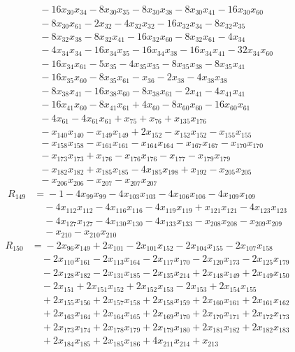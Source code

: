 \begin{align*}
&\quad{}-16x_{30}x_{34} -8x_{30}x_{35} -8x_{30}x_{38} -8x_{30}x_{41} -16x_{30}x_{60}\\
&\quad{}-8x_{30}x_{61} -2x_{32} -4x_{32}x_{32} -16x_{32}x_{34} -8x_{32}x_{35}\\
&\quad{}-8x_{32}x_{38} -8x_{32}x_{41} -16x_{32}x_{60} -8x_{32}x_{61} -4x_{34}\\
&\quad{}-4x_{34}x_{34} -16x_{34}x_{35} -16x_{34}x_{38} -16x_{34}x_{41} -32x_{34}x_{60}\\
&\quad{}-16x_{34}x_{61} -5x_{35} -4x_{35}x_{35} -8x_{35}x_{38} -8x_{35}x_{41}\\
&\quad{}-16x_{35}x_{60} -8x_{35}x_{61} -x_{36} -2x_{38} -4x_{38}x_{38}\\
&\quad{}-8x_{38}x_{41} -16x_{38}x_{60} -8x_{38}x_{61} -2x_{41} -4x_{41}x_{41}\\
&\quad{}-16x_{41}x_{60} -8x_{41}x_{61} +4x_{60} -8x_{60}x_{60} -16x_{60}x_{61}\\
&\quad{}-4x_{61} -4x_{61}x_{61} +x_{75} +x_{76} +x_{135}x_{176}\\
&\quad{}-x_{140}x_{140} -x_{149}x_{149} +2x_{152} -x_{152}x_{152} -x_{155}x_{155}\\
&\quad{}-x_{158}x_{158} -x_{161}x_{161} -x_{164}x_{164} -x_{167}x_{167} -x_{170}x_{170}\\
&\quad{}-x_{173}x_{173} +x_{176} -x_{176}x_{176} -x_{177} -x_{179}x_{179}\\
&\quad{}-x_{182}x_{182} +x_{185}x_{185} -4x_{185}x_{198} +x_{192} -x_{205}x_{205}\\
&\quad{}-x_{206}x_{206} -x_{207} -x_{207}x_{207}
\end{align*}
\begin{align*}
R_{149}&={}-1 -4x_{99}x_{99} -4x_{103}x_{103} -4x_{106}x_{106} -4x_{109}x_{109}\\
&\quad{}-4x_{112}x_{112} -4x_{116}x_{116} -4x_{119}x_{119} +x_{121}x_{121} -4x_{123}x_{123}\\
&\quad{}-4x_{127}x_{127} -4x_{130}x_{130} -4x_{133}x_{133} -x_{208}x_{208} -x_{209}x_{209}\\
&\quad{}-x_{210} -x_{210}x_{210}
\end{align*}
\begin{align*}
R_{150}&={}-2x_{96}x_{149} +2x_{101} -2x_{101}x_{152} -2x_{104}x_{155} -2x_{107}x_{158}\\
&\quad{}-2x_{110}x_{161} -2x_{113}x_{164} -2x_{117}x_{170} -2x_{120}x_{173} -2x_{125}x_{179}\\
&\quad{}-2x_{128}x_{182} -2x_{131}x_{185} -2x_{135}x_{214} +2x_{148}x_{149} +2x_{149}x_{150}\\
&\quad{}-2x_{151} +2x_{151}x_{152} +2x_{152}x_{153} -2x_{153} +2x_{154}x_{155}\\
&\quad{}+2x_{155}x_{156} +2x_{157}x_{158} +2x_{158}x_{159} +2x_{160}x_{161} +2x_{161}x_{162}\\
&\quad{}+2x_{163}x_{164} +2x_{164}x_{165} +2x_{169}x_{170} +2x_{170}x_{171} +2x_{172}x_{173}\\
&\quad{}+2x_{173}x_{174} +2x_{178}x_{179} +2x_{179}x_{180} +2x_{181}x_{182} +2x_{182}x_{183}\\
&\quad{}+2x_{184}x_{185} +2x_{185}x_{186} +4x_{211}x_{214} +x_{213}
\end{align*}
